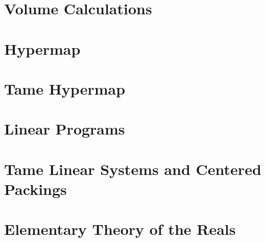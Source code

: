 \documentclass[cup9a]{cupbook}
\begin{document}
    \chapter{Volume Calculations}
    
    \chapter{Hypermap}\label{chap:hypermap}
    



    
    
    
    \chapter{Tame Hypermap}
    


    \label{part:lp}
    \label{part:lprelax}
    \chapter{Linear Programs}
    
    \chapter{Tame Linear Systems and Centered Packings}
    



    \label{part:appendix}
    
    \chapter{Elementary Theory of the Reals}
     
\end{document}
